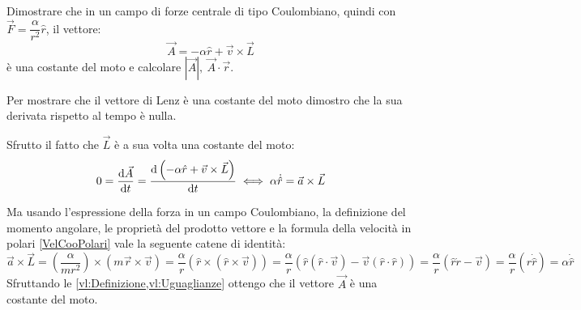 \documentclass[../main.tex]{subfiles}
\begin{document}

\textex
Dimostrare che in un campo di forze centrale di tipo Coulombiano, quindi con $\vec{F}=\dfrac{\alpha}{r^2}\hat r$, il vettore:
\begin{equation} \label{vl:Definizione}
	\vec{A}=-\alpha \hat r + \vec v\times \vec L
\end{equation}
è una costante del moto e calcolare $|\vec A|,\ \vec{A} \cdot \vec{r}$.


\solution
Per mostrare che il vettore di Lenz è una costante del moto dimostro che la sua derivata rispetto al tempo è nulla.

Sfrutto il fatto che $\vec L$ è a sua volta una costante del moto:
\begin{equation}\label{vl:Derivata}
	0=\frac{\mathrm{d} \vec A}{\mathrm{d} t}=\frac{\mathrm{d} \left(-\alpha\hat r + \vec v\times \vec L\right) }{\mathrm{d} t} \iff \alpha\dot{\hat r} = \vec a\times \vec L
\end{equation}

Ma usando l'espressione della forza in un campo Coulombiano, la definizione del momento angolare, le proprietà del prodotto vettore 
e la formula della velocità in polari \cref{VelCooPolari} vale la seguente catene di identità:
\begin{equation}\label{vl:Uguaglianze}
	\vec a\times \vec L=\left(\dfrac{\alpha}{mr^2}\right)\times\left(m\vec r\times \vec v\right)=\frac{\alpha}{r} \left(\hat r\times \left(\hat r\times \vec v\right)\right)
        =\frac{\alpha}{r} \left(\hat r\left(\hat r \cdot \vec v\right)-\vec v\left(\hat r\cdot \hat r\right)\right)
	=\frac{\alpha}{r} \left(\hat r\dot{r}-\vec v\right)=\frac{\alpha}{r}\left(r\dot{\hat r}\right)=\alpha \dot{\hat r}
\end{equation}
Sfruttando le \cref{vl:Definizione,vl:Uguaglianze} ottengo che il vettore $\vec A$ è una costante del moto.
\end{document}
